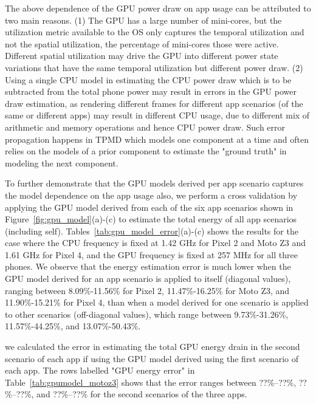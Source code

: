 The above dependence of the GPU power draw on app usage can be
attributed to two main reasons.  (1) The GPU has a large number of
mini-cores, but the utilization metric available to the OS only
captures the temporal utilization and not the spatial utilization, \ie
the percentage of mini-cores those were active.  Different spatial
utilization may drive the GPU into different power state variations
that have the same temporal utilization but different power draw.
% 
(2) Using a single CPU model in estimating the CPU power draw which is
 to be subtracted from the total phone power may result in errors in
 the GPU power draw estimation, as rendering different frames for
 different app scenarios (of the same or different apps) may result in
 different CPU usage, \eg due to different mix of arithmetic and
 memory operations and hence CPU power draw.  Such error propagation
 happens in TPMD which models one component at a time and often relies
 on the models of a prior component to estimate the "ground truth" in
 modeling the next component.

To further demonstrate that the GPU models derived per app scenario captures
the model dependence on the app usage also, we perform a cross validation
by applying the GPU model derived from each of the six app scenarios
shown in Figure~\ref{fig:gpu_model}(a)-(c) to estimate the total
energy of all app scenarios (including self).
Tables~\ref{tab:gpu_model_error}(a)-(c) shows the results for 
the case where the CPU frequency is fixed at 1.42 GHz for Pixel 2 and Moto Z3 and 1.61 GHz for Pixel 4, and the GPU frequency is fixed at 257 MHz for all three phones.
We observe that the energy estimation error
is much lower when the GPU model derived for an app scenario is
applied to itself (diagonal values), ranging between 
8.09\%-11.56\% for Pixel 2,
11.47\%-16.25\% for Moto Z3, and
11.90\%-15.21\% for Pixel 4,
than when a model derived for one scenario is applied
to other scenarios (off-diagonal values), which
range between 
9.73\%-31.26\%,
11.57\%-44.25\%, and
13.07\%-50.43\%.




we calculated the error
in estimating the total GPU energy drain in the second scenario of each app 
if using the GPU model derived using the first scenario of each app.
The rows labelled "GPU energy error" in Table~\ref{tab:gpumodel_motoz3} shows that the error ranges between ??\%--??\%, ??\%--??\%, and ??\%--??\% for the second scenarios of the three apps.
\fi





